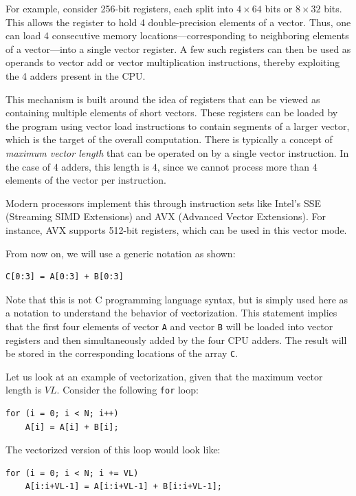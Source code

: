 \documentclass[12pt]{book}
\begin{document}
For example, consider 256-bit registers, each split into $4 \times 64$ bits or $8 \times 32$ bits. This allows the register to hold 4 double-precision elements of a vector. Thus, one can load 4 consecutive memory locations—corresponding to neighboring elements of a vector—into a single vector register. A few such registers can then be used as operands to vector add or vector multiplication instructions, thereby exploiting the 4 adders present in the CPU.

This mechanism is built around the idea of registers that can be viewed as containing multiple elements of short vectors. These registers can be loaded by the program using vector load instructions to contain segments of a larger vector, which is the target of the overall computation. There is typically a concept of \textit{maximum vector length} that can be operated on by a single vector instruction. In the case of 4 adders, this length is 4, since we cannot process more than 4 elements of the vector per instruction.

Modern processors implement this through instruction sets like Intel’s SSE (Streaming SIMD Extensions) and AVX (Advanced Vector Extensions). For instance, AVX supports 512-bit registers, which can be used in this vector mode.

From now on, we will use a generic notation as shown:
\begin{lstlisting}[style=cppstyle]
C[0:3] = A[0:3] + B[0:3]
\end{lstlisting}

Note that this is not C programming language syntax, but is simply used here as a notation to understand the behavior of vectorization. This statement implies that the first four elements of vector \texttt{A} and vector \texttt{B} will be loaded into vector registers and then simultaneously added by the four CPU adders. The result will be stored in the corresponding locations of the array \texttt{C}.

Let us look at an example of vectorization, given that the maximum vector length is $VL$. Consider the following \texttt{for} loop:

\begin{lstlisting}[style=cppstyle]
for (i = 0; i < N; i++)
    A[i] = A[i] + B[i];
\end{lstlisting}

The vectorized version of this loop would look like:

\begin{lstlisting}[style=cppstyle]
for (i = 0; i < N; i += VL)
    A[i:i+VL-1] = A[i:i+VL-1] + B[i:i+VL-1];
\end{lstlisting}
\end{document}
